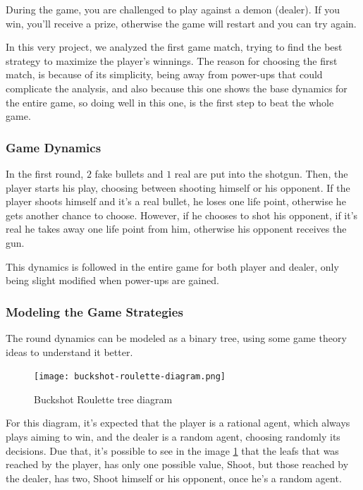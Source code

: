 \documentclass{article}
\begin{document}
During the game, you are challenged to play against a demon (dealer). If you win, you'll receive a prize, otherwise the game will restart and you can try again.

In this very project, we analyzed the first game match, trying to find the best strategy to maximize the player's winnings. The reason for choosing the first match, is because of its simplicity, being away from power-ups that could complicate the analysis, and also because this one shows the base dynamics for the entire game, so doing well in this one, is the first step to beat the whole game.

\subsubsection{Game Dynamics}

In the first round, $2$ fake bullets and $1$ real are put into the shotgun. Then, the player starts his play, choosing between shooting himself or his opponent. If the player shoots himself and it's a real bullet, he loses one life point, otherwise he gets another chance to choose. However, if he chooses to shot his opponent, if it's real he takes away one life point from him, otherwise his opponent receives the gun.

This dynamics is followed in the entire game for both player and dealer, only being slight modified when power-ups are gained.

\newpage

\subsubsection{Modeling the Game Strategies}
The round dynamics can be modeled as a binary tree, using some game theory ideas to understand it better.

\begin{figure}[h]
	\centering
	\texttt{[image: buckshot-roulette-diagram.png]}
	\caption{Buckshot Roulette tree diagram}
	\label{fig:classical-model-bckr}
\end{figure}

For this diagram, it's expected that the player is a rational agent, which always plays aiming to win, and the dealer is a random agent, choosing randomly its decisions. Due that, it's possible to see in the image \ref{fig:classical-model-bckr} that the leafs that was reached by the player, has only one possible value, Shoot, but those reached by the dealer, has two, Shoot himself or his opponent, once he's a random agent.
\end{document}
